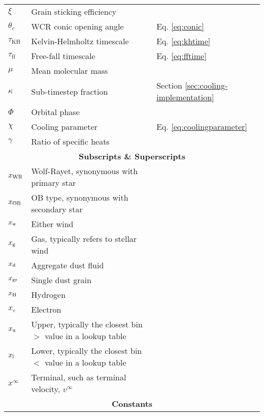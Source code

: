 \begin{Common_Symbols}
\begin{longtable}[c]{lll}
  $\xi$ & Grain sticking efficiency & \\

  $\theta_c$ & WCR conic opening angle & Eq. \ref{eq:conic} \\
  
  $\tau_\text{KH}$ & Kelvin-Helmholtz timescale & Eq. \ref{eq:khtime} \\
  $\tau_\text{ff}$ & Free-fall timescale & Eq. \ref{eq:fftime} \\

  $\mu$ & Mean molecular mass & \\

  $\kappa$ & Sub-timestep fraction & Section \ref{sec:cooling-implementation} \\

  $\Phi$ & Orbital phase & \\

  $\chi$ & Cooling parameter  & Eq. \ref{eq:coolingparameter} \\

  $\gamma$ & Ratio of specific heats & \\

  \hline
  \multicolumn{3}{c}{\textbf{Subscripts \& Superscripts}} \\
  \hline

  $x_\text{WR}$   & Wolf-Rayet, synonymous with primary star & \\
  $x_\text{OB}$   & OB type, synonymous with secondary star & \\
  $x_\text{w}$    & Either wind & \\
  $x_\text{g}$    & Gas, typically refers to stellar wind & \\
  $x_\text{d}$    & Aggregate dust fluid & \\
  $x_\text{gr}$   & Single dust grain & \\
  $x_\text{H}$    & Hydrogen & \\
  $x_e$         & Electron & \\
  $x_\text{u}$    & Upper, typically the closest bin $>$ value in a lookup table & \\
  $x_\text{l}$    & Lower, typically the closest bin $<$ value in a lookup table & \\
  $x^\infty$    & Terminal, such as terminal velocity, $v^\infty$ & \\

  \hline
  \multicolumn{3}{c}{\textbf{Constants}} \\
  \hline


\end{longtable}
\end{Common_Symbols}
